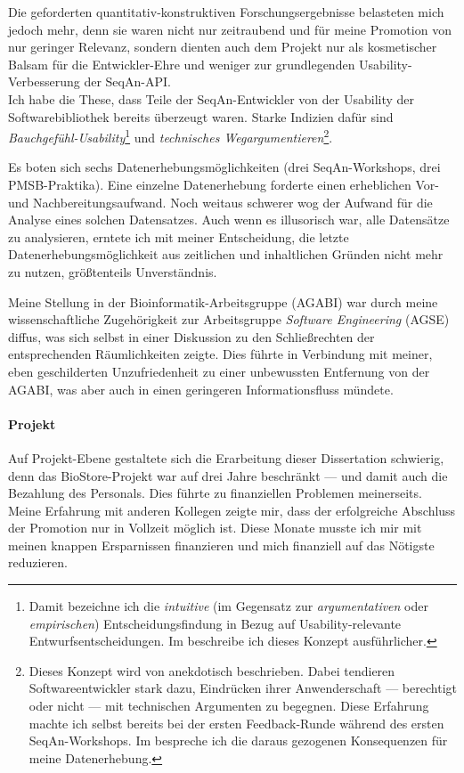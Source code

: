 Die geforderten quantitativ-konstruktiven Forschungsergebnisse belasteten mich jedoch mehr, denn sie waren nicht nur zeitraubend und für meine Promotion von nur geringer Relevanz, sondern dienten auch dem Projekt nur als kosmetischer Balsam für die Entwickler-Ehre und weniger zur grundlegenden Usability-Verbesserung der SeqAn-API.
\\Ich habe die These, dass Teile der SeqAn-Entwickler von der Usability der Softwarebibliothek bereits überzeugt waren. Starke Indizien dafür sind \textit{Bauchgefühl-Usability}\footnote{Damit bezeichne ich die \textit{intuitive} (im Gegensatz zur \textit{argumentativen} oder \textit{empirischen}) Entscheidungsfindung in Bezug auf Usability-relevante Entwurfsentscheidungen. Im  beschreibe ich dieses Konzept ausführlicher.}
und \textit{technisches Wegargumentieren}\footnote{Dieses Konzept wird von \cite{Sarodnick:2006vc} anekdotisch beschrieben. Dabei tendieren Softwareentwickler stark dazu, Eindrücken ihrer Anwenderschaft --- berechtigt oder nicht --- mit technischen Argumenten zu begegnen. Diese Erfahrung machte ich selbst bereits bei der ersten Feedback-Runde während des ersten SeqAn-Workshops. Im  bespreche ich die daraus gezogenen Konsequenzen für meine Datenerhebung.}.

Es boten sich sechs Datenerhebungsmöglichkeiten (drei SeqAn-Workshops, drei PMSB-Praktika). Eine einzelne Datenerhebung forderte einen erheblichen Vor- und Nachbereitungsaufwand. Noch weitaus schwerer wog der Aufwand für die Analyse eines solchen Datensatzes. Auch wenn es illusorisch war, alle Datensätze zu analysieren, erntete ich mit meiner Entscheidung, die letzte Datenerhebungsmöglichkeit aus zeitlichen und inhaltlichen Gründen nicht mehr zu nutzen, größtenteils Unverständnis.

Meine Stellung in der Bioinformatik-Arbeitsgruppe (AGABI) war durch meine wissenschaftliche Zugehörigkeit zur Arbeitsgruppe \textit{Software Engineering} (AGSE) diffus, was sich selbst in einer Diskussion zu den Schließrechten der entsprechenden Räumlichkeiten zeigte. Dies führte in Verbindung mit meiner, eben geschilderten Unzufriedenheit zu einer unbewussten Entfernung von der AGABI, was aber auch in einen geringeren Informationsfluss mündete. 

\paragraph{Projekt}

Auf Projekt-Ebene gestaltete sich die Erarbeitung dieser Dissertation schwierig, denn das BioStore-Projekt war auf drei Jahre beschränkt --- und damit auch die Bezahlung des Personals. Dies führte zu finanziellen Problemen meinerseits. Meine Erfahrung mit anderen Kollegen zeigte mir, dass der erfolgreiche Abschluss der Promotion nur in Vollzeit möglich ist. Diese Monate musste ich mir mit meinen knappen Ersparnissen finanzieren und mich finanziell auf das Nötigste reduzieren.

